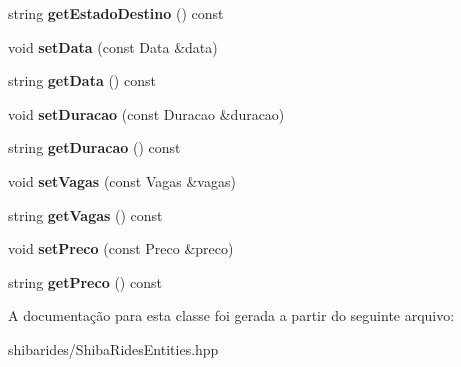 \begin{DoxyCompactItemize}
\item 
string {\bfseries get\+Estado\+Destino} () const \hypertarget{classCarona_aea16ae34b4382fbd9061bffee0b5eec5}{}\label{classCarona_aea16ae34b4382fbd9061bffee0b5eec5}

\item 
void {\bfseries set\+Data} (const Data \&data)\hypertarget{classCarona_aad1f948190263bb39b48af4b7b431566}{}\label{classCarona_aad1f948190263bb39b48af4b7b431566}

\item 
string {\bfseries get\+Data} () const \hypertarget{classCarona_a44d7c1aeb6742aca6dbe67133449c7ff}{}\label{classCarona_a44d7c1aeb6742aca6dbe67133449c7ff}

\item 
void {\bfseries set\+Duracao} (const Duracao \&duracao)\hypertarget{classCarona_ad491ad037732a1c716dc0e66b5415cf5}{}\label{classCarona_ad491ad037732a1c716dc0e66b5415cf5}

\item 
string {\bfseries get\+Duracao} () const \hypertarget{classCarona_aae9d8e29cd04c8bf89dad6adec868bc3}{}\label{classCarona_aae9d8e29cd04c8bf89dad6adec868bc3}

\item 
void {\bfseries set\+Vagas} (const Vagas \&vagas)\hypertarget{classCarona_a7439117116a0ecc316885ecf0e6e7d46}{}\label{classCarona_a7439117116a0ecc316885ecf0e6e7d46}

\item 
string {\bfseries get\+Vagas} () const \hypertarget{classCarona_ae5ed62c4d0c6d82eddf53a76453587f4}{}\label{classCarona_ae5ed62c4d0c6d82eddf53a76453587f4}

\item 
void {\bfseries set\+Preco} (const Preco \&preco)\hypertarget{classCarona_a8016d701bc97a26814c40576b2d3b8b3}{}\label{classCarona_a8016d701bc97a26814c40576b2d3b8b3}

\item 
string {\bfseries get\+Preco} () const \hypertarget{classCarona_a9f09336175fab7200e44137a0e4ff50b}{}\label{classCarona_a9f09336175fab7200e44137a0e4ff50b}

\end{DoxyCompactItemize}


A documentação para esta classe foi gerada a partir do seguinte arquivo\+:\begin{DoxyCompactItemize}
\item 
shibarides/Shiba\+Rides\+Entities.\+hpp\end{DoxyCompactItemize}
